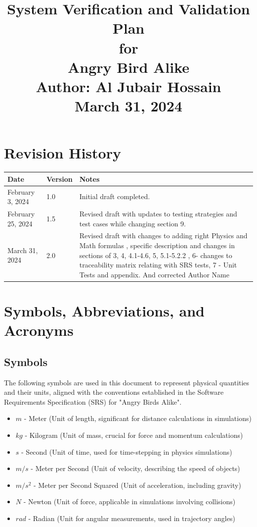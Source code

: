 \documentclass[12pt]{article}
\title{
    {\Huge System Verification and Validation Plan} \\
    {\Large for} \\
    {\LARGE Angry Bird Alike} \\
    \vspace{0.5em}
    {\Large Author: Al Jubair Hossain} \\
    \vspace{0.5em}
    {\large March 31, 2024}
}
\date{}
\begin{document}
\maketitle

\newpage

\section*{Revision History}
\begin{tabular}{|l|l|p{10cm}|}
    \hline
    \textbf{Date} & \textbf{Version} & \textbf{Notes} \\
    \hline
    February 3, 2024 & 1.0 & Initial draft completed. \\\hline
    February 25, 2024 & 1.5 & Revised draft with updates to testing strategies and test cases while changing section 9. \\\hline
    March 31, 2024 & 2.0 & Revised draft with changes to adding right Physics and Math formulas , specific description and changes in sections of 3, 4, 4.1-4.6, 5, 5.1-5.2.2 , 6- changes to traceability matrix relating with SRS tests, 7 - Unit Tests and appendix. And corrected Author Name \\
    \hline
\end{tabular}

\newpage

\tableofcontents

\newpage

\section{Symbols, Abbreviations, and Acronyms}

\subsection{Symbols}
The following symbols are used in this document to represent physical quantities and their units, aligned with the conventions established in the Software Requirements Specification (SRS) for "Angry Birds Alike".

\begin{itemize}
    \item \(m\) - Meter (Unit of length, significant for distance calculations in simulations)
    \item \(kg\) - Kilogram (Unit of mass, crucial for force and momentum calculations)
    \item \(s\) - Second (Unit of time, used for time-stepping in physics simulations)
    \item \(m/s\) - Meter per Second (Unit of velocity, describing the speed of objects)
    \item \(m/s^2\) - Meter per Second Squared (Unit of acceleration, including gravity)
    \item \(N\) - Newton (Unit of force, applicable in simulations involving collisions)
    \item \(rad\) - Radian (Unit for angular measurements, used in trajectory angles)
\end{itemize}
\end{document}
